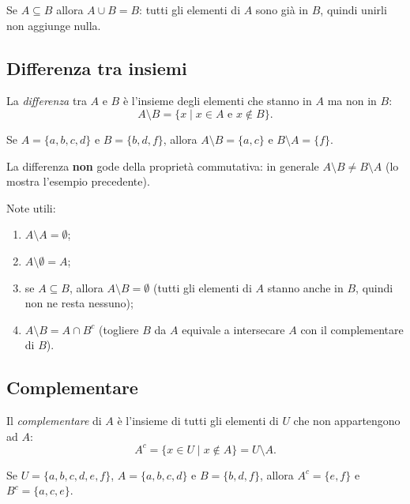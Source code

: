 \documentclass[11pt,a4paper]{article}
\begin{document}
\begin{esempio}
Se $A \subseteq B$ allora $A \cup B = B$: tutti gli elementi di $A$ sono già in $B$, quindi unirli non aggiunge nulla.
\end{esempio}

\subsection{Differenza tra insiemi}

\begin{definizione}
La \emph{differenza} tra $A$ e $B$ è l'insieme degli elementi che
stanno in $A$ ma non in $B$:
\[
A \setminus B = \{x \mid x \in A \text{ e } x \notin B\}.
\]
\end{definizione}

\begin{esempio}
Se $A = \{a, b, c, d\}$ e $B = \{b, d, f\}$, allora
$A \setminus B = \{a, c\}$ e $B \setminus A = \{f\}$.
\end{esempio}

La differenza \textbf{non} gode della proprietà commutativa: in generale
$A \setminus B \neq B \setminus A$ (lo mostra l'esempio precedente).

Note utili:
\begin{enumerate}
    \item $A \setminus A = \emptyset$;
    \item $A \setminus \emptyset = A$;
    \item se $A \subseteq B$, allora $A \setminus B = \emptyset$
          (tutti gli elementi di $A$ stanno anche in $B$, quindi non ne
          resta nessuno);
    \item $A \setminus B = A \cap B^c$ (togliere $B$ da $A$ equivale a
          intersecare $A$ con il complementare di $B$).
\end{enumerate}

\subsection{Complementare}

\begin{definizione}
Il \emph{complementare} di $A$ è l'insieme di tutti gli elementi di $U$
che non appartengono ad $A$:
\[
A^c = \{x \in U \mid x \notin A\} = U \setminus A.
\]
\end{definizione}

\begin{esempio}
Se $U = \{a, b, c, d, e, f\}$, $A = \{a, b, c, d\}$ e $B = \{b, d, f\}$,
allora $A^c = \{e, f\}$ e $B^c = \{a, c, e\}$.
\end{esempio}
\end{document}
